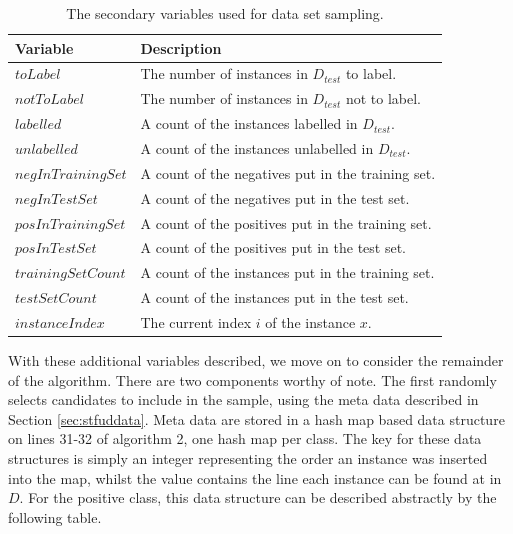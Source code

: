 \documentclass[twoside,a4paper]{refart}
\begin{document}
\begin{table}[htp]
\centering
    \begin{tabular}{|l|l|}
    \hline
    Variable & Description \\ \hline
    $toLabel$        & The number of instances in $D_{test}$ to label.           \\[2ex]
    $notToLabel$        & The number of instances in $D_{test}$ not to label.            \\[2ex]
    $labelled$        & A count of the instances labelled in $D_{test}$.           \\[2ex]
    $unlabelled$        & A count of the instances unlabelled in $D_{test}$.           \\[2ex]
    $negInTrainingSet$        & A count of the negatives put in the training set.           \\[2ex]
    $negInTestSet$        & A count of the negatives put in the test set.           \\[2ex]
    $posInTrainingSet$        & A count of the positives put in the training set.           \\[2ex]
    $posInTestSet$        & A count of the positives put in the test set.           \\[2ex]
    $trainingSetCount$        & A count of the instances put in the training set.           \\[2ex]
    $testSetCount$        & A count of the instances put in the test set.           \\[2ex]
    $instanceIndex$        & The current index $i$ of the instance $x$.           \\\hline
    \end{tabular}
    \caption[The secondary variables used for data set sampling.]{The secondary variables used for data set sampling.}
\label{tab:vars2}
\end{table}
With these additional variables described, we move on to consider the remainder of the algorithm. There are two components worthy of note. The first randomly selects candidates to include in the sample, using the meta data described in Section \ref{sec:stfuddata}. Meta data are stored in a hash map based data structure on lines 31-32 of algorithm 2, one hash map per class. The key for these data structures is simply an integer representing the order an instance was inserted into the map, whilst the value contains the line each instance can be found at in $D$. For the positive class, this data structure can be described abstractly by the following table.
\end{document}
